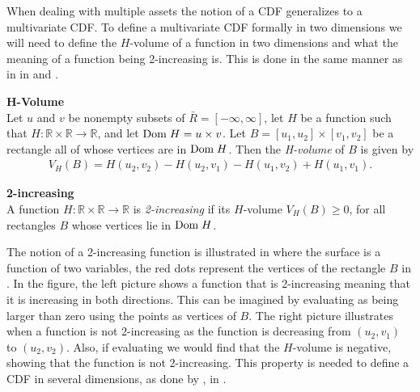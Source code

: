 When dealing with multiple assets the notion of a \gls{CDF} generalizes to a multivariate \gls{CDF}. To define a multivariate \gls{CDF} formally in two dimensions we will need to define the $H$-volume of a function in two dimensions and what the meaning of a function being 2-increasing is. This is done in the same manner as in  in  and .

\begin{definition}\label{def:H-volume} \textbf{H-Volume} \\
    Let $u$ and $v$ be nonempty subsets of $\bar{R} = [-\infty, \infty]$, let $H$ be a function such that $H:\mathbb{R}\times\mathbb{R}\to \mathbb{R}$, and let $\mathrm{Dom \;} H = u\times v$. Let $B = [u_1,u_2]\times[v_1,v_2]$  be a rectangle all of whose vertices are in $\mathrm{Dom \;} H$. Then
    the \emph{H-volume} of $B$ is given by
    \begin{align}\label{eq:H-volume}
        V_H(B) = H(u_2,v_2) - H(u_2,v_1) - H(u_1,v_2) + H(u_1,v_1).
    \end{align}
\end{definition}

\begin{definition}\label{def:2-Increasing} \textbf{2-increasing} \\
     A function $H:\mathbb{R}\times\mathbb{R}\to \mathbb{R}$ is \emph{2-increasing} if its $H$-volume $V_H(B)\geq0$, for all rectangles $B$ whose vertices lie in $\mathrm{Dom \;} H$.
\end{definition}

The notion of a 2-increasing function is illustrated in  where the surface is a function of two variables, the red dots represent the vertices of the rectangle $B$ in . In the figure, the left picture shows a function that is 2-increasing meaning that it is increasing in both directions. This can be imagined by evaluating  as being larger than zero using the points as vertices of $B$. The right picture illustrates when a function is not 2-increasing as the function is decreasing from $(u_2,v_1)$ to $(u_2,v_2)$. Also, if evaluating  we would find that the $H$-volume is negative, showing that the function is not 2-increasing. This property is needed to define a \gls{CDF} in several dimensions, as done by , in . 

